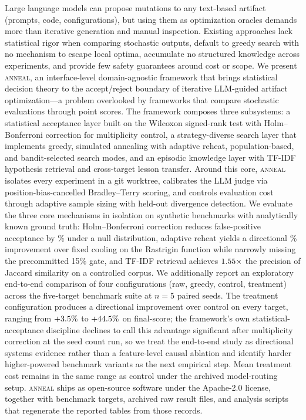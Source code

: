 Large language models can propose mutations to any text-based artifact (prompts, code, configurations), but using them as optimization oracles demands more than iterative generation and manual inspection.
%
Existing approaches lack statistical rigor when comparing stochastic outputs, default to greedy search with no mechanism to escape local optima, accumulate no structured knowledge across experiments, and provide few safety guarantees around cost or scope.
%
We present \textsc{anneal}, an interface-level domain-agnostic framework that brings statistical decision theory to the accept/reject boundary of iterative LLM-guided artifact optimization---a problem overlooked by frameworks that compare stochastic evaluations through point scores.
%
The framework composes three subsystems: a statistical acceptance layer built on the Wilcoxon signed-rank test with Holm--Bonferroni correction for multiplicity control, a strategy-diverse search layer that implements greedy, simulated annealing with adaptive reheat, population-based, and bandit-selected search modes, and an episodic knowledge layer with TF-IDF hypothesis retrieval and cross-target lesson transfer.
%
Around this core, \textsc{anneal} isolates every experiment in a git worktree, calibrates the LLM judge via position-bias-cancelled Bradley--Terry scoring, and controls evaluation cost through adaptive sample sizing with held-out divergence detection.
%
We evaluate the three core mechanisms in isolation on synthetic benchmarks with analytically known ground truth: Holm--Bonferroni correction reduces false-positive acceptance by \fpReductionPct\% under a null distribution, adaptive reheat yields a directional \saImprovementPct\% improvement over fixed cooling on the Rastrigin function while narrowly missing the precommitted 15\% gate, and TF-IDF retrieval achieves $1.55\times$ the precision of Jaccard similarity on a controlled corpus.
%
We additionally report an exploratory end-to-end comparison of four configurations (raw, greedy, control, treatment) across the five-target benchmark suite at $n = 5$ paired seeds.
The treatment configuration produces a directional improvement over control on every target, ranging from $+3.5\%$ to $+44.5\%$ on final-score; the framework's own statistical-acceptance discipline declines to call this advantage significant after multiplicity correction at the seed count run, so we treat the end-to-end study as directional systems evidence rather than a feature-level causal ablation and identify harder higher-powered benchmark variants as the next empirical step.
Mean treatment cost remains in the same range as control under the archived model-routing setup.
%
\textsc{anneal} ships as open-source software under the Apache-2.0 license, together with benchmark targets, archived raw result files, and analysis scripts that regenerate the reported tables from those records.
